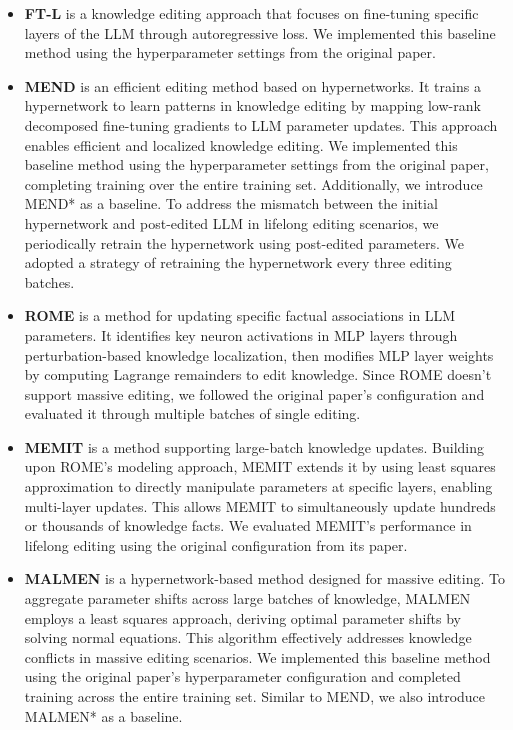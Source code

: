 \begin{itemize}
    \item \textbf{FT-L} \cite{modifying} is a knowledge editing approach that focuses on fine-tuning specific layers of the LLM through autoregressive loss. We implemented this baseline method using the hyperparameter settings from the original paper.
    \item \textbf{MEND} \cite{mend} is an efficient editing method based on hypernetworks. It trains a hypernetwork to learn patterns in knowledge editing by mapping low-rank decomposed fine-tuning gradients to LLM parameter updates. This approach enables efficient and localized knowledge editing. We implemented this baseline method using the hyperparameter settings from the original paper, completing training over the entire training set. Additionally, we introduce MEND* as a baseline. To address the mismatch between the initial hypernetwork and post-edited LLM in lifelong editing scenarios, we periodically retrain the hypernetwork using post-edited parameters. We adopted a strategy of retraining the hypernetwork every three editing batches.
    \item \textbf{ROME} \cite{rome} is a method for updating specific factual associations in LLM parameters. It identifies key neuron activations in MLP layers through perturbation-based knowledge localization, then modifies MLP layer weights by computing Lagrange remainders to edit knowledge. Since ROME doesn't support massive editing, we followed the original paper's configuration and evaluated it through multiple batches of single editing.
    \item \textbf{MEMIT} \cite{memit} is a method supporting large-batch knowledge updates. Building upon ROME's modeling approach, MEMIT extends it by using least squares approximation to directly manipulate parameters at specific layers, enabling multi-layer updates. This allows MEMIT to simultaneously update hundreds or thousands of knowledge facts. We evaluated MEMIT's performance in lifelong editing using the original configuration from its paper.
    \item \textbf{MALMEN} \cite{malmen} is a hypernetwork-based method designed for massive editing. To aggregate parameter shifts across large batches of knowledge, MALMEN employs a least squares approach, deriving optimal parameter shifts by solving normal equations. This algorithm effectively addresses knowledge conflicts in massive editing scenarios. We implemented this baseline method using the original paper's hyperparameter configuration and completed training across the entire training set. Similar to MEND, we also introduce MALMEN* as a baseline.

\end{itemize}
